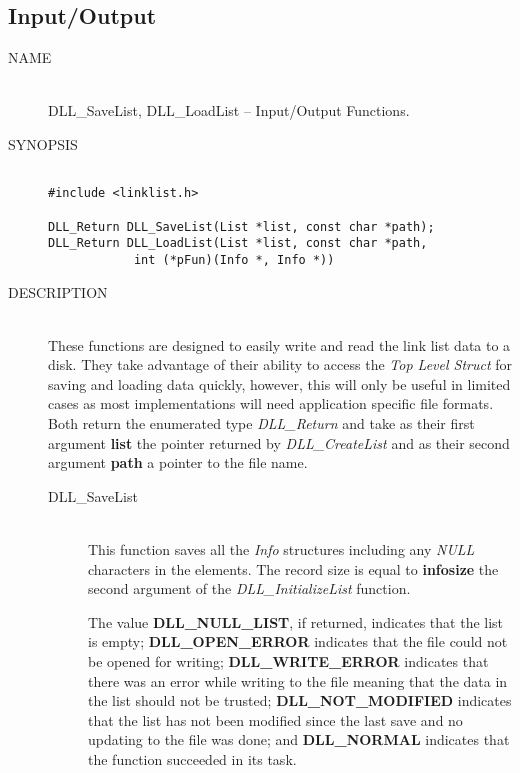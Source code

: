 \documentclass[10pt,letterpaper,titlepage]{article}
\begin{document}
\pagebreak

\subsection{Input/Output}
\begin{description}
\item[NAME]\quad\\
DLL\_SaveList, DLL\_LoadList -- Input/Output Functions.

\item[SYNOPSIS]
\begin{verbatim}

#include <linklist.h>

DLL_Return DLL_SaveList(List *list, const char *path);
DLL_Return DLL_LoadList(List *list, const char *path,
            int (*pFun)(Info *, Info *))
\end{verbatim}

\item[DESCRIPTION]\quad\\
These functions are designed to easily write and read the link list data to a disk.  They take advantage of their ability to access the \emph{Top Level Struct} for saving and loading data quickly, however, this will only be useful in limited cases as most implementations will need application specific file formats.  Both return the enumerated type \emph{DLL\_Return} and take as their first argument \textbf{list} the pointer returned by \emph{DLL\_CreateList} and as their second argument \textbf{path} a pointer to the file name.

 \begin{description}
 \item[DLL\_SaveList]\quad\\
 This function saves all the \emph{Info} structures including any \emph{NULL} characters in the elements.  The record size is equal to \textbf{infosize} the second argument of the \emph{DLL\_InitializeList} function.
\vspace{8pt}

\noindent
  The value \textbf{DLL\_NULL\_LIST}, if returned, indicates that the list is empty; \textbf{DLL\_OPEN\_ERROR} indicates that the file could not be opened for writing; \textbf{DLL\_WRITE\_ERROR} indicates that there was an error while writing to the file meaning that the data in the list should not be trusted; \textbf{DLL\_NOT\_MODIFIED} indicates that the list has not been modified since the last save and no updating to the file was done; and \textbf{DLL\_NORMAL} indicates that the function succeeded in its task.


\end{description}
\end{description}
\end{document}

